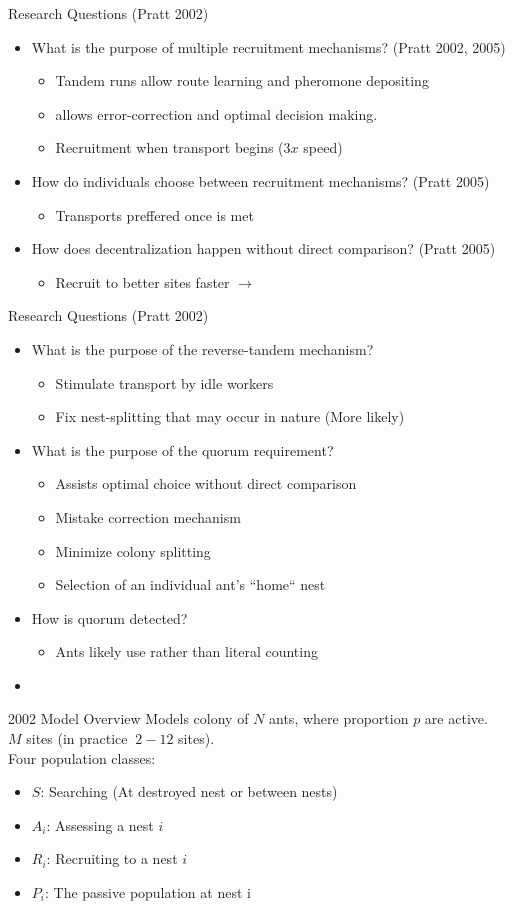 \documentclass{beamer}
\makeatletter
\def\mcolor#1#{\@mcolor{#1}}
\def\@mcolor#1#2#3{%
  \protect\leavevmode
  \begingroup
    \color#1{#2}#3%
  \endgroup
}
\newcommand{\sitem}[1]
{
    \begin{itemize}
        \item #1
    \end{itemize}
}
\makeatother
\begin{document}
  \begin{frame}{Research Questions (Pratt 2002)}
      \begin{itemize}
          \item What is the purpose of multiple recruitment mechanisms? (Pratt 2002, 2005)
              \sitem{Tandem runs allow route learning and pheromone depositing}
              \sitem{ allows error-correction and optimal decision making.}
              \sitem{Recruitment  when transport begins ($3x$ speed)}
          \item How do individuals choose between recruitment mechanisms? (Pratt 2005)
              \sitem{Transports preffered once  is met}
          \item How does decentralization happen without direct comparison? (Pratt 2005)
              \sitem{Recruit to better sites faster $\rightarrow$ \mcolor{red}{positive feedback}}
      \end{itemize}
  \end{frame}

  \begin{frame}{Research Questions (Pratt 2002)}
      \begin{itemize}
          \item What is the purpose of the reverse-tandem mechanism?
              \sitem{Stimulate transport by idle workers}
              \sitem{Fix nest-splitting that may occur in nature (More likely)}
          \item What is the purpose of the quorum requirement?
              \sitem{Assists optimal choice without direct comparison}
              \sitem{Mistake correction mechanism}
              \sitem{Minimize colony splitting}
              \sitem{Selection of an individual ant's ``home`` nest}
          \item How is quorum detected?
              \sitem{Ants likely use  rather than literal counting}
          \item {}
      \end{itemize}
  \end{frame}

  \begin{frame}{2002 Model Overview}
      Models colony of $N$ ants, where proportion $p$ are active. \\
      $M$ sites (in practice $~2-12$ sites). \\
      Four population classes: 
      \begin{itemize}
          \item $S$: Searching (At destroyed nest or between nests) 
          \item $A_i$: Assessing a nest $i$ 
          \item $R_i$: Recruiting to a nest $i$ 
          \item $P_i$: The passive population at nest i 
      \end{itemize}
  \end{frame}
\end{document}
